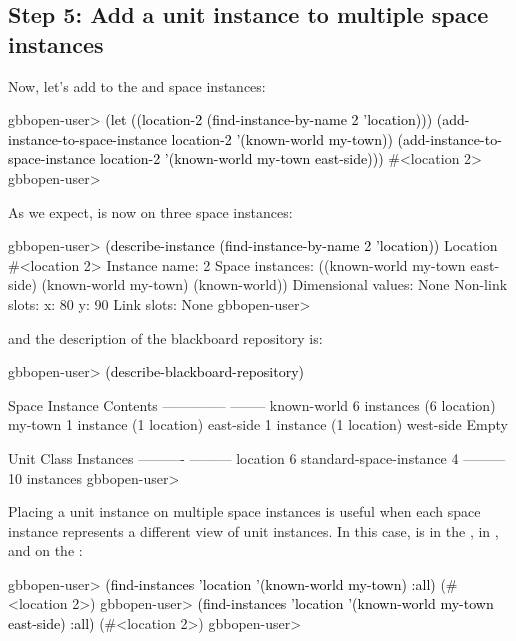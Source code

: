 \documentclass[10pt,twoside,english,pdftex]{article}
\begin{document}
\subsection*{Step 5: Add a unit instance to multiple space instances}

%
%
Now, let's add   to the  and 
 space instances:
%
\W\supp
\begin{example}
\textcolor{darkergray}{%
  gbbopen-user> \textcolor{black}{(let ((location-2 (find-instance-by-name 2 'location)))
                 (add-instance-to-space-instance location-2 '(known-world my-town))
                 (add-instance-to-space-instance location-2 '(known-world my-town east-side)))}
  #<location 2>
  gbbopen-user>}
\end{example}
%
%
%
As we expect,   is now on three space instances:
%
\W\supp\notpretop
\begin{example}
\textcolor{darkergray}{%
  gbbopen-user> \textcolor{black}{(describe-instance (find-instance-by-name 2 'location))}
  Location #<location 2>
    Instance name: 2
    Space instances: ((known-world my-town east-side)
                      (known-world my-town)
                      (known-world))
    Dimensional values: None
    Non-link slots:
      x:  80
      y:  90
    Link slots: None
  gbbopen-user>}
\end{example}
%
and the description of the blackboard repository is:
%
\W\supp\notpretop
\begin{example}
\textcolor{darkergray}{%
  gbbopen-user> \textcolor{black}{(describe-blackboard-repository)}

  Space Instance                Contents
  --------------                --------
  known-world                   6 instances (6 location)
     my-town                    1 instance (1 location)
        east-side               1 instance (1 location)
        west-side               Empty

  Unit Class                    Instances
  ----------                    ---------
  location                              6
  standard-space-instance               4
                                ---------
                                       10 instances
  gbbopen-user>}
\end{example}

Placing a unit instance on multiple space instances is useful when each space
instance represents a different view of unit instances.  In this case,
  is in the , in , and
on the :
%
\W\supp
\begin{example}
\textcolor{darkergray}{%
  gbbopen-user> \textcolor{black}{(find-instances 'location '(known-world my-town) :all)}
  (#<location 2>)
  gbbopen-user> \textcolor{black}{(find-instances 'location '(known-world my-town east-side) :all)}
  (#<location 2>)
  gbbopen-user>}
\end{example}
\end{document}
